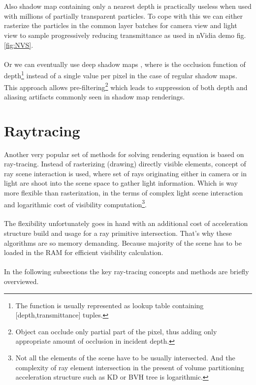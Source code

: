 \\
\\
Also shadow map containing only a nearest depth is practically useless when used with millions of partially transparent particles. To cope with this we can either rasterize the particles in the common layer batches for camera view and light view to sample progressively reducing transmittance as used in nVidia demo fig. \ref{fig:NVS}. 
\\
\\
Or we can eventually use deep shadow maps \cite{LokDSM}, where is the occlusion function of depth\footnote{The function is usually represented as lookup table containing [depth,transmittance] tuples.} instead of a single value per pixel in the case of regular shadow maps. This approach allows pre-filtering\footnote{Object can occlude only partial part of the pixel, thus adding only appropriate amount of occlusion in incident depth.} which leads to suppression of both depth and aliasing artifacts commonly seen in shadow map renderings.
\\
\clearpage{}


\section{Raytracing}
Another very popular set of methods for solving rendering equation is based on ray-tracing. Instead of rasterizing (drawing) directly visible elements, concept of ray scene interaction is used, where set of rays originating either in camera or in light are shoot into the scene space to gather light information. Which is way more flexible than rasterization, in the terms of complex light scene interaction and logarithmic cost of visibility computation\footnote{Not all the elements of the scene have to be usually intersected. And the complexity of ray element intersection in the present of volume partitioning acceleration structure such as KD or BVH tree is logarithmic.}.
\\
\\
The flexibility unfortunately goes in hand with an additional cost of acceleration structure build and usage for a ray primitive intersection. That's why these algorithms are so memory demanding. Because majority of the scene has to be loaded in the RAM for efficient visibility calculation.
\\
\\
In the following subsections the key ray-tracing concepts and methods are briefly overviewed.  

